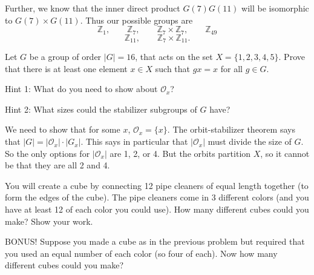 \documentclass[11pt]{exam}
\def\Z{\mathbb Z}
\begin{document}
\begin{questions}
\begin{solution}
  Further, we know that the inner direct product $G(7)G(11)$ will be isomorphic to $G(7)\times G(11)$.  Thus our possible groups are
  \[\Z_1, \qquad \Z_{7}, \qquad \Z_7\times \Z_7, \qquad \Z_{49}\]
  \[\Z_{11}, \qquad \Z_{7}\times \Z_{11}.\]
\end{solution}


\vfill


\question[6] Let $G$ be a group of order $|G| = 16$, that acts on the set $X = \{1,2,3,4,5\}$.  Prove that there is at least one element $x \in X$ such that $gx = x$ for all $g \in G$.  

Hint 1: What do you need to show about $\mathcal O_x$?   

Hint 2: What sizes could the stabilizer subgroups of $G$ have?  

\begin{solution}
  We need to show that for some $x$, $\mathcal O_x = \{x\}$.  The orbit-stabilizer theorem says that $|G| = |\mathcal O_x|\cdot |G_x|$.  This says in particular that $|\mathcal O_x|$ must divide the size of $G$.  So the only options for $|\mathcal O_x|$ are 1, 2, or 4.  But the orbits partition $X$, so it cannot be that they are all 2 and 4.
\end{solution}

\vfill

\clearpage

\question[12] You will create a cube by connecting 12 pipe cleaners  of equal length together (to form the edges of the cube).  The pipe cleaners come in 3 different colors (and you have at least 12 of each color you could use).  How many different cubes could you make?  Show your work.

\vfill
\vfill

\bonusquestion[10] BONUS! Suppose you made a cube as in the previous problem but required that you used an equal number of each color (so four of each).  Now how many different cubes could you make?
\vfill

\end{questions}
\end{document}
